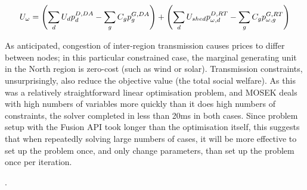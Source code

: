 \documentclass[11pt,a4paper]{article}
\numberwithin{equation}{section}
\begin{document}
\begin{equation}
U_\omega = \left( \sum_d U_d p^{D,DA}_d - \sum_g C_g p^{G,DA}_g \right) + \left( \sum_d U_{shed} p^{D,RT}_{\omega,d} - \sum_g C_g p^{G,RT}_{\omega,g} \right)
\end{equation}




\begin{table}[htbp]
    \centering

    \caption{Market clearing summary}
    \label{tab:summary}
\end{table}

As anticipated, congestion of inter-region transmission causes prices to differ between nodes; in this particular constrained case, the marginal generating unit in the North region is zero-cost (such as wind or solar).
Transmission constraints, unsurprisingly, also reduce the objective value (the total social welfare).
As this was a relatively straightforward linear optimisation problem, and MOSEK deals with high numbers of variables more quickly than it does high numbers of constraints, the solver completed in less than 20ms in both cases.
Since problem setup with the Fusion API took longer than the optimisation itself, this suggests that when repeatedly solving large numbers of cases, it will be more effective to set up the problem once, and only change parameters, than set up the problem once per iteration.




\FloatBarrier



\renewcommand{\refname}{\section{References}}.

\end{document}

